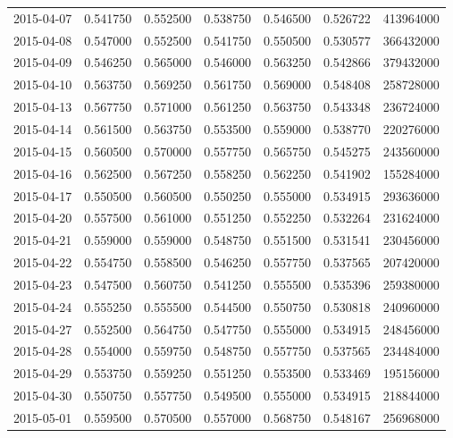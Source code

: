 \begin{tabular}{lrrrrrr}
2015-04-07 &    0.541750 &    0.552500 &    0.538750 &    0.546500 &    0.526722 &   413964000 \\
2015-04-08 &    0.547000 &    0.552500 &    0.541750 &    0.550500 &    0.530577 &   366432000 \\
2015-04-09 &    0.546250 &    0.565000 &    0.546000 &    0.563250 &    0.542866 &   379432000 \\
2015-04-10 &    0.563750 &    0.569250 &    0.561750 &    0.569000 &    0.548408 &   258728000 \\
2015-04-13 &    0.567750 &    0.571000 &    0.561250 &    0.563750 &    0.543348 &   236724000 \\
2015-04-14 &    0.561500 &    0.563750 &    0.553500 &    0.559000 &    0.538770 &   220276000 \\
2015-04-15 &    0.560500 &    0.570000 &    0.557750 &    0.565750 &    0.545275 &   243560000 \\
2015-04-16 &    0.562500 &    0.567250 &    0.558250 &    0.562250 &    0.541902 &   155284000 \\
2015-04-17 &    0.550500 &    0.560500 &    0.550250 &    0.555000 &    0.534915 &   293636000 \\
2015-04-20 &    0.557500 &    0.561000 &    0.551250 &    0.552250 &    0.532264 &   231624000 \\
2015-04-21 &    0.559000 &    0.559000 &    0.548750 &    0.551500 &    0.531541 &   230456000 \\
2015-04-22 &    0.554750 &    0.558500 &    0.546250 &    0.557750 &    0.537565 &   207420000 \\
2015-04-23 &    0.547500 &    0.560750 &    0.541250 &    0.555500 &    0.535396 &   259380000 \\
2015-04-24 &    0.555250 &    0.555500 &    0.544500 &    0.550750 &    0.530818 &   240960000 \\
2015-04-27 &    0.552500 &    0.564750 &    0.547750 &    0.555000 &    0.534915 &   248456000 \\
2015-04-28 &    0.554000 &    0.559750 &    0.548750 &    0.557750 &    0.537565 &   234484000 \\
2015-04-29 &    0.553750 &    0.559250 &    0.551250 &    0.553500 &    0.533469 &   195156000 \\
2015-04-30 &    0.550750 &    0.557750 &    0.549500 &    0.555000 &    0.534915 &   218844000 \\
2015-05-01 &    0.559500 &    0.570500 &    0.557000 &    0.568750 &    0.548167 &   256968000 \\

\end{tabular}

